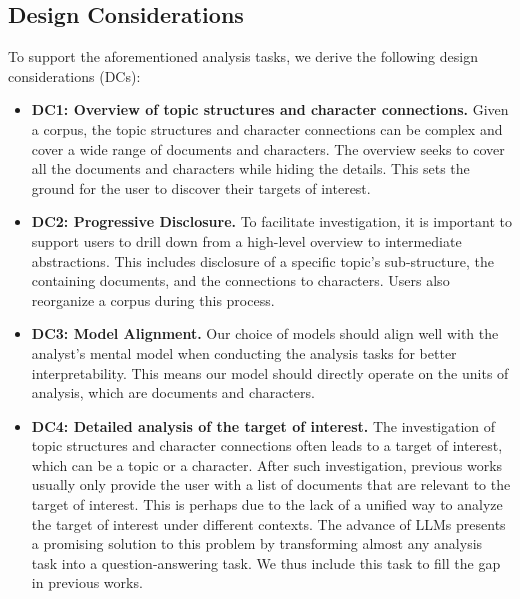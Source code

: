 \subsection{Design Considerations}
To support the aforementioned analysis tasks, we derive the following design considerations (DCs):
\begin{itemize}
  \item \textbf{DC1: Overview of topic structures and character connections.}
  Given a corpus, the topic structures and character connections can be complex and cover a wide range of documents and characters. 
  The overview seeks to cover all the documents and characters while hiding the details.
  This sets the ground for the user to discover their targets of interest.
  \item \textbf{DC2: Progressive Disclosure.}
  To facilitate investigation, it is important to support users to drill down from a high-level overview to intermediate abstractions.
  This includes disclosure of a specific topic's sub-structure, the containing documents, and the connections to characters.
  Users also reorganize a corpus during this process.
  \item \textbf{DC3: Model Alignment.}
  Our choice of models should align well with the analyst's mental model when conducting the analysis tasks for better interpretability.
  This means our model should directly operate on the units of analysis, which are documents and characters.
  \item \textbf{DC4: Detailed analysis of the target of interest.}
  The investigation of topic structures and character connections often leads to a target of interest, which can be a topic or a character.
  After such investigation, previous works usually only provide the user with a list of documents that are relevant to the target of interest.
  This is perhaps due to the lack of a unified way to analyze the target of interest under different contexts.
  The advance of LLMs presents a promising solution to this problem by transforming almost any analysis task into a question-answering task.
  We thus include this task to fill the gap in previous works.
\end{itemize}


